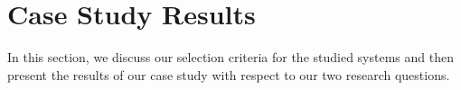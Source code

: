 
\section{Case Study Results}\label{sec:results}

In this section, we discuss our selection criteria for the studied systems and then present the results of our case study with respect to our two research questions.



